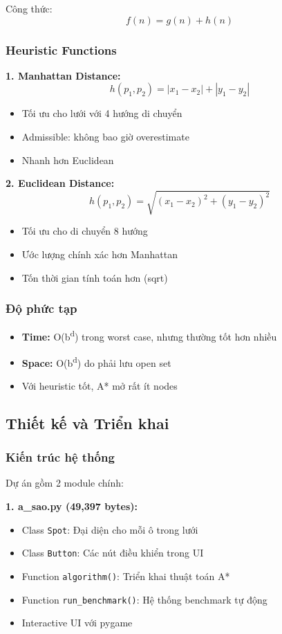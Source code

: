 \documentclass[12pt,a4paper]{article}
\begin{document}
Công thức: 
\[f(n) = g(n) + h(n)\]

\subsubsection{Heuristic Functions}
\textbf{1. Manhattan Distance:}
\[h(p_1, p_2) = |x_1 - x_2| + |y_1 - y_2|\]
\begin{itemize}
    \item Tối ưu cho lưới với 4 hướng di chuyển
    \item Admissible: không bao giờ overestimate
    \item Nhanh hơn Euclidean
\end{itemize}

\textbf{2. Euclidean Distance:}
\[h(p_1, p_2) = \sqrt{(x_1 - x_2)^2 + (y_1 - y_2)^2}\]
\begin{itemize}
    \item Tối ưu cho di chuyển 8 hướng
    \item Ước lượng chính xác hơn Manhattan
    \item Tốn thời gian tính toán hơn (sqrt)
\end{itemize}

\subsubsection{Độ phức tạp}
\begin{itemize}
    \item \textbf{Time:} O(b\textsuperscript{d}) trong worst case, nhưng thường tốt hơn nhiều
    \item \textbf{Space:} O(b\textsuperscript{d}) do phải lưu open set
    \item Với heuristic tốt, A* mở rất ít nodes
\end{itemize}

\subsection{Thiết kế và Triển khai}

\subsubsection{Kiến trúc hệ thống}
Dự án gồm 2 module chính:

\textbf{1. a\_sao.py (49,397 bytes):}
\begin{itemize}
    \item Class \texttt{Spot}: Đại diện cho mỗi ô trong lưới
    \item Class \texttt{Button}: Các nút điều khiển trong UI
    \item Function \texttt{algorithm()}: Triển khai thuật toán A*
    \item Function \texttt{run\_benchmark()}: Hệ thống benchmark tự động
    \item Interactive UI với pygame
\end{itemize}
\end{document}
